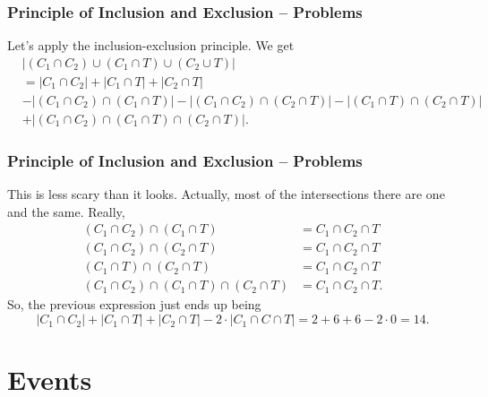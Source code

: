 \documentclass[aspectratio=169,11pt,usenames,dvipsnames,handout]{beamer}
\begin{document}
\begin{frame}
 \frametitle{Principle of Inclusion and Exclusion -- Problems}
 Let's apply the inclusion-exclusion principle. We get
 \begin{align*}
  &|(C_1 \cap C_2) \cup (C_1 \cap T) \cup (C_2 \cup T)| \\
  &= |C_1 \cap C_2| + |C_1 \cap T| + |C_2 \cap T| \\
                                                       &- |(C_1 \cap C_2) \cap
                                                       (C_1 \cap T)| - |(C_1
                                                       \cap C_2) \cap (C_2 \cap
                                                       T)| 
                                                       - |(C_1 \cap T) \cap
                                                       (C_2 \cap T)| \\
                                                       &+ |(C_1 \cap C_2) \cap
                                                       (C_1 \cap T) \cap (C_2
                                                       \cap T)|.
 \end{align*}
\end{frame}

\begin{frame}
 \frametitle{Principle of Inclusion and Exclusion -- Problems}
 This is less scary than it looks. Actually, most of the intersections there are
 one and the same. Really,
 \begin{align*}
  (C_1 \cap C_2) \cap (C_1 \cap T) &= C_1 \cap C_2 \cap T \\
  (C_1 \cap C_2) \cap (C_2 \cap T) &= C_1 \cap C_2 \cap T \\
  (C_1 \cap T) \cap (C_2 \cap T) &= C_1 \cap C_2 \cap T \\
  (C_1 \cap C_2) \cap (C_1 \cap T) \cap (C_2 \cap T) &= C_1 \cap C_2 \cap T.
 \end{align*}
 \pause
 So, the previous expression just ends up being
 \[
  |C_1 \cap C_2| + |C_1 \cap T| + |C_2 \cap T| - 2 \cdot |C_1 \cap C \cap T| = 2
  + 6 + 6 - 2 \cdot 0 = 14.
 \]
 
\end{frame}

\section{Events}
\label{sec:events}
\end{document}
